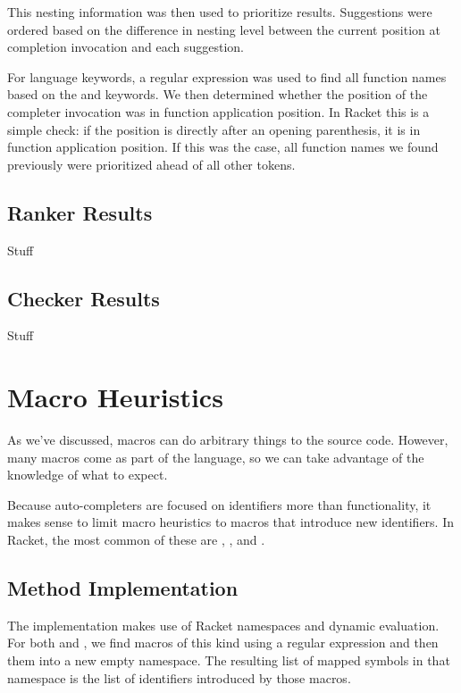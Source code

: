 \documentclass[ms,electronic,twosidetoc,letterpaper,chaptercenter,parttop,lol,lof,lot]{byumsphd}
\begin{document}
This nesting information was then used to prioritize results. Suggestions were ordered based on the difference in nesting level between the current position at completion invocation and each suggestion.

For language keywords, a regular expression was used to find all function names based on the  and  keywords. We then determined whether the position of the completer invocation was in function application position. In Racket this is a simple check: if the position is directly after an opening parenthesis, it is in function application position. If this was the case, all function names we found previously were prioritized ahead of all other tokens.

\subsection{Ranker Results}

Stuff

\subsection{Checker Results}

Stuff

\section{Macro Heuristics}

As we've discussed, macros can do arbitrary things to the source code. However, many macros come as part of the language, so we can take advantage of the knowledge of what to expect.

Because auto-completers are focused on identifiers more than functionality, it makes sense to limit macro heuristics to macros that introduce new identifiers. In Racket, the most common of these are , , and .

\subsection{Method Implementation}

The implementation makes use of Racket namespaces and dynamic evaluation. For both  and , we find macros of this kind using a regular expression and then  them into a new empty namespace. The resulting list of mapped symbols in that namespace is the list of identifiers introduced by those macros.
\end{document}

